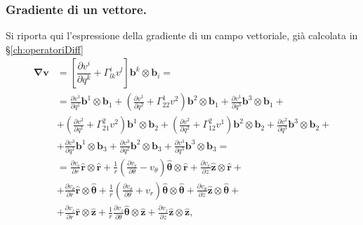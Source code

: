 \subsubsection{Gradiente di un vettore.}
Si riporta qui l'espressione della gradiente di un campo vettoriale, già calcolata in \S\ref{ch:operatoriDiff}
\begin{equation}
\begin{aligned}
    \bm{\nabla} \bm{v} & = \left[ \dfrac{\partial v^i}{\partial q^k} + \Gamma_{lk}^i v^l \right] \bm{b}^k \otimes \bm{b}_i = \\
     & = \frac{\partial v^1}{\partial q^1}                                   \bm{b}^1 \otimes \bm{b}_1   + 
        \left( \frac{\partial v^1}{\partial q^2} + \Gamma_{22}^1 v^2 \right) \bm{b}^2 \otimes \bm{b}_1   + 
        \frac{\partial v^1}{\partial q^3}                                    \bm{b}^3 \otimes \bm{b}_1   + \\
     & + \left( \frac{\partial v^2}{\partial q^1} + \Gamma_{21}^2 v^2 \right)\bm{b}^1 \otimes \bm{b}_2   + 
        \left( \frac{\partial v^2}{\partial q^2} + \Gamma_{12}^2 v^1 \right) \bm{b}^2 \otimes \bm{b}_2   + 
        \frac{\partial v^2}{\partial q^3}                                    \bm{b}^3 \otimes \bm{b}_2   + \\
     & + \frac{\partial v^3}{\partial q^1}                                   \bm{b}^1 \otimes \bm{b}_3   + 
        \frac{\partial v^3}{\partial q^2}                                    \bm{b}^2 \otimes \bm{b}_3   + 
        \frac{\partial v^3}{\partial q^3}                                    \bm{b}^3 \otimes \bm{b}_3   = \\
     & = \frac{\partial v_r}{\partial r}                                           \bm{\hat{r}}      \otimes \bm{\hat{r}}       + 
        \frac{1}{r}\left( \frac{\partial v_r}{\partial \theta} - v_\theta \right)  \bm{\hat{\theta}} \otimes \bm{\hat{r}}       + 
        \frac{\partial v_r}{\partial z}                                            \bm{\hat{z}}      \otimes \bm{\hat{r}}       + \\
     & +  \frac{\partial v_\theta}{\partial r}                                     \bm{\hat{r}}      \otimes \bm{\hat{\theta}}  + 
        \frac{1}{r}\left( \frac{\partial v_\theta}{\partial \theta} +  v_r \right) \bm{\hat{\theta}} \otimes \bm{\hat{\theta}}  + 
        \frac{\partial v_\theta}{\partial z}                                       \bm{\hat{z}}      \otimes \bm{\hat{\theta}}  + \\
     & + \frac{\partial v_z}{\partial r}                                           \bm{\hat{r}}      \otimes \bm{\hat{z}}       + 
        \frac{1}{r}\frac{\partial v_z}{\partial \theta}                            \bm{\hat{\theta}} \otimes \bm{\hat{z}}       + 
        \frac{\partial v_z}{\partial z}                                            \bm{\hat{z}}      \otimes \bm{\hat{z}}        ,
\end{aligned}
\end{equation}
